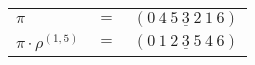 \begin{example}\label{example:DOFVIMRX}
  \hfill
  \begin{\position}
    \begin{tabular}{lll}
      $\pi$ & $=$ & $({0}~\underline{{4}~{5}~{3}~{2}~{1}}~{6})$ \\
      $\pi \cdot \rho^{(1,5)}$ & $=$ & $({0}~\underline{{1}~{2}~{3}~{5}~{4}}~{6})$ \\
    \end{tabular}
  \end{\position}
\end{example}